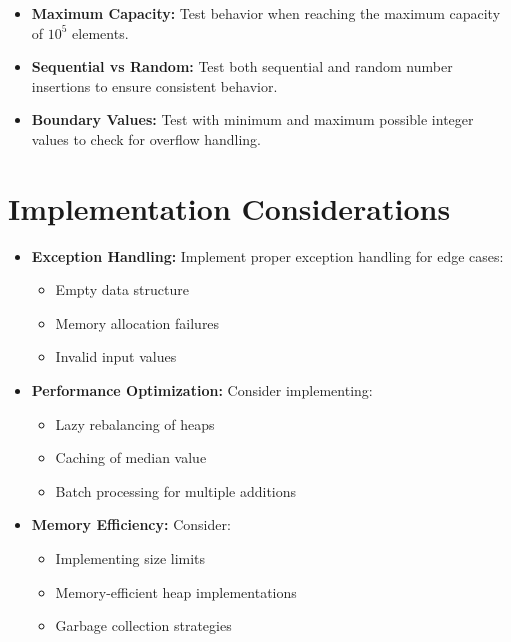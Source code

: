 \begin{itemize}
    \item \textbf{Maximum Capacity:} Test behavior when reaching the maximum capacity of \(10^5\) elements.
    
    \item \textbf{Sequential vs Random:} Test both sequential and random number insertions to ensure consistent behavior.
    
    \item \textbf{Boundary Values:} Test with minimum and maximum possible integer values to check for overflow handling.
\end{itemize}

\section*{Implementation Considerations}

\begin{itemize}
    \item \textbf{Exception Handling:} Implement proper exception handling for edge cases:
    \begin{itemize}
        \item Empty data structure
        \item Memory allocation failures
        \item Invalid input values
    \end{itemize}
    
    \item \textbf{Performance Optimization:} Consider implementing:
    \begin{itemize}
        \item Lazy rebalancing of heaps
        \item Caching of median value
        \item Batch processing for multiple additions
    \end{itemize}
    
    \item \textbf{Memory Efficiency:} Consider:
    \begin{itemize}
        \item Implementing size limits
        \item Memory-efficient heap implementations
        \item Garbage collection strategies
    \end{itemize}
\end{itemize}

\printindex